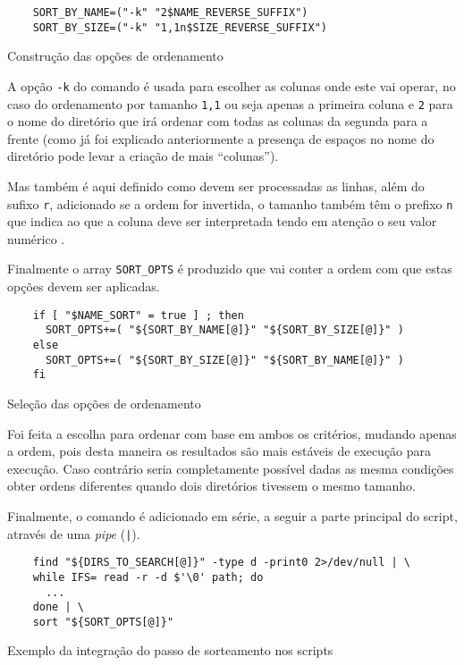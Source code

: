 \begin{listing}[H]
	\centering
	\begin{verbatim}
    SORT_BY_NAME=("-k" "2$NAME_REVERSE_SUFFIX")
    SORT_BY_SIZE=("-k" "1,1n$SIZE_REVERSE_SUFFIX")
  \end{verbatim}
	\caption{Construção das opções de ordenamento}
	\label{code:implementation_sort_fields}
\end{listing}

A opção \Verb|-k| do comando  é usada para escolher as colunas
onde este vai operar, no caso do ordenamento por tamanho \Verb|1,1| ou seja apenas
a primeira coluna e \Verb|2| para o nome do diretório que irá ordenar com todas
as colunas da segunda para a frente (como já foi explicado anteriormente a
presença de espaços no nome do diretório pode levar a criação de mais
\enquote{colunas}).

Mas também é aqui definido como devem ser processadas as linhas, além do sufixo
\Verb|r|, adicionado se a ordem for invertida, o tamanho também têm o prefixo
\Verb|n| que indica ao  que a coluna deve ser interpretada
tendo em atenção o seu valor numérico \cite[3248]{posix}.

Finalmente o array \Verb|SORT_OPTS| é produzido que vai conter a ordem com que
estas opções devem ser aplicadas.

\begin{listing}[H]
	\centering
	\begin{verbatim}
    if [ "$NAME_SORT" = true ] ; then
      SORT_OPTS+=( "${SORT_BY_NAME[@]}" "${SORT_BY_SIZE[@]}" )
    else
      SORT_OPTS+=( "${SORT_BY_SIZE[@]}" "${SORT_BY_NAME[@]}" )
    fi
  \end{verbatim}
	\caption{Seleção das opções de ordenamento}
\end{listing}

Foi feita a escolha para ordenar com base em ambos os critérios, mudando apenas
a ordem, pois desta maneira os resultados são mais estáveis de execução para
execução. Caso contrário seria completamente possível dadas as mesma condições
obter ordens diferentes quando dois diretórios tivessem o mesmo tamanho.

Finalmente, o comando  é adicionado em série, a seguir a parte
principal do script, através de uma \emph{pipe} (\Verb_|_).

\begin{listing}[H]
	\centering
	\begin{verbatim}
    find "${DIRS_TO_SEARCH[@]}" -type d -print0 2>/dev/null | \
    while IFS= read -r -d $'\0' path; do
      ...
    done | \
    sort "${SORT_OPTS[@]}"
  \end{verbatim}
	\caption{Exemplo da integração do passo de sorteamento nos scripts}
\end{listing}


